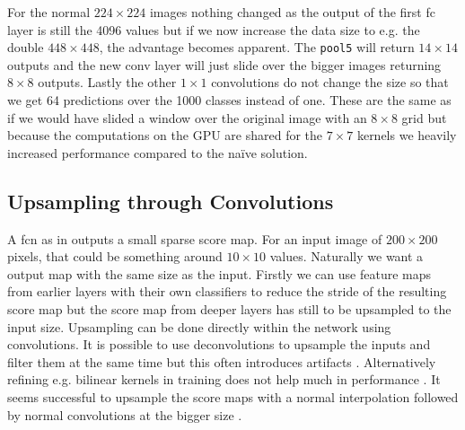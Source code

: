 For the normal $224\times224$ images nothing changed as the output of the first \gls{fc} layer is still the 4096 values but if we now increase the data size to e.g. the double $448\times448$, the advantage becomes apparent. The \texttt{pool5} will return $14\times14$ outputs and the new \gls{conv} layer will just slide over the bigger images returning $8\times8$ outputs. Lastly the other $1\times1$ convolutions do not change the size so that we get 64 predictions over the 1000 classes instead of one. These are the same as if we would have slided a window over the original image with an $8\times8$ grid but because the computations on the GPU are shared for the $7\times7$ kernels we heavily increased performance compared to the naïve solution.

\subsection{Upsampling through Convolutions}
\label{sub:concepts:fcn:upsampling}
A \gls{fcn} as in \citep{long_fully_2015} outputs a small sparse score map. For an input image of $200\times 200$ pixels, that could be something around $10\times 10$ values. Naturally we want a output map with the same size as the input. Firstly we can use feature maps from earlier layers with their own classifiers to reduce the stride of the resulting score map but the score map from deeper layers has still to be upsampled to the input size. Upsampling can be done directly within the network using convolutions. It is possible to use deconvolutions to upsample the inputs and filter them at the same time but this often introduces artifacts \citep{odena_deconvolution_2016}. Alternatively refining e.g. bilinear kernels in training does not help much in performance \citep{shelhamer_fully_2016}. It seems successful to upsample the score maps with a normal interpolation followed by normal convolutions at the bigger size \citep{dong_image_2016}.


